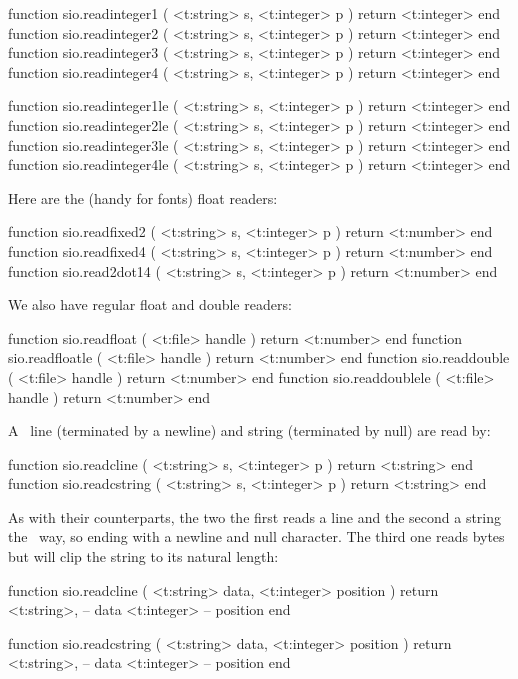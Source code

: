 function sio.readinteger1 ( <t:string> s, <t:integer> p ) return <t:integer> end
function sio.readinteger2 ( <t:string> s, <t:integer> p ) return <t:integer> end
function sio.readinteger3 ( <t:string> s, <t:integer> p ) return <t:integer> end
function sio.readinteger4 ( <t:string> s, <t:integer> p ) return <t:integer> end

function sio.readinteger1le ( <t:string> s, <t:integer> p ) return <t:integer> end
function sio.readinteger2le ( <t:string> s, <t:integer> p ) return <t:integer> end
function sio.readinteger3le ( <t:string> s, <t:integer> p ) return <t:integer> end
function sio.readinteger4le ( <t:string> s, <t:integer> p ) return <t:integer> end
\stoptyping

Here are the (handy for fonts) float readers:

\starttyping[option=LUA]
function sio.readfixed2 ( <t:string> s, <t:integer> p ) return <t:number> end
function sio.readfixed4 ( <t:string> s, <t:integer> p ) return <t:number> end
function sio.read2dot14 ( <t:string> s, <t:integer> p ) return <t:number> end
\stoptyping

We also have regular float and double readers:

\starttyping[option=LUA]
function sio.readfloat    ( <t:file> handle ) return <t:number>  end
function sio.readfloatle  ( <t:file> handle ) return <t:number>  end
function sio.readdouble   ( <t:file> handle ) return <t:number>  end
function sio.readdoublele ( <t:file> handle ) return <t:number>  end
\stoptyping

A \CCODE\ line (terminated by a newline) and string (terminated by null) are read
by:

\starttyping[option=LUA]
function sio.readcline   ( <t:string> s, <t:integer> p ) return <t:string> end
function sio.readcstring ( <t:string> s, <t:integer> p ) return <t:string> end
\stoptyping

As with their  counterparts, the two the first reads a line and the
second a string the \CCODE\ way, so ending with a newline and null character. The
third one reads  bytes but will clip the string to its natural length:

\starttyping[option=LUA]
function sio.readcline   (
    <t:string>  data,
    <t:integer> position
)
    return
        <t:string>,  -- data
        <t:integer>  -- position
end

function sio.readcstring (
    <t:string>  data,
    <t:integer> position
)
    return
        <t:string>,  -- data
        <t:integer>  -- position
end

